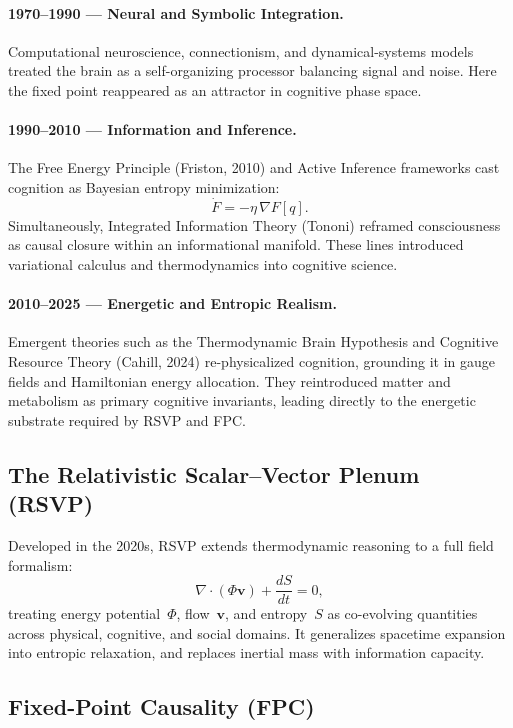 \documentclass[12pt,a4paper]{article}
\begin{document}
\paragraph{1970–1990 — Neural and Symbolic Integration.}
Computational neuroscience, connectionism, and dynamical-systems models
treated the brain as a self-organizing processor balancing signal and noise.
Here the fixed point reappeared as an attractor in cognitive phase space.

\paragraph{1990–2010 — Information and Inference.}
The Free Energy Principle (Friston, 2010) and Active Inference frameworks
cast cognition as Bayesian entropy minimization:
\[
\dot F = -\eta\,\nabla F[q].
\]
Simultaneously, Integrated Information Theory (Tononi) reframed consciousness as causal closure within an informational manifold.
These lines introduced variational calculus and thermodynamics into cognitive science.

\paragraph{2010–2025 — Energetic and Entropic Realism.}
Emergent theories such as the Thermodynamic Brain Hypothesis and Cognitive Resource Theory (Cahill, 2024)
re-physicalized cognition, grounding it in gauge fields and Hamiltonian energy allocation.
They reintroduced matter and metabolism as primary cognitive invariants,
leading directly to the energetic substrate required by RSVP and FPC.

\subsection{The Relativistic Scalar–Vector Plenum (RSVP)}

Developed in the 2020s, RSVP extends thermodynamic reasoning to
a full field formalism:
\[
\nabla\!\cdot(\Phi\mathbf{v})+\frac{dS}{dt}=0,
\]
treating energy potential~$\Phi$, flow~$\mathbf{v}$, and entropy~$S$
as co-evolving quantities across physical, cognitive, and social domains.
It generalizes spacetime expansion into entropic relaxation,
and replaces inertial mass with information capacity.

\subsection{Fixed-Point Causality (FPC)}
\end{document}

